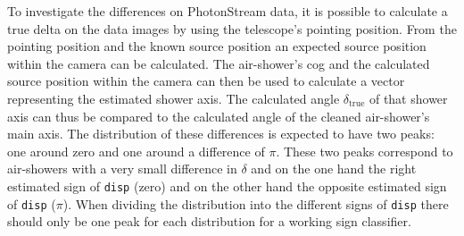 To investigate the differences on PhotonStream data, it is possible to
calculate a true delta on the data images by using the telescope's pointing
position. From the pointing position and the known source position an
expected source position within the camera can be calculated. The
air-shower's cog and the calculated source position within the camera can
then be used to calculate a vector representing the estimated shower axis.
The calculated angle $\delta_\text{true}$ of that shower axis can thus be
compared to the calculated angle of the cleaned air-shower's main axis. The
distribution of these differences is expected to have two peaks: one around
zero and one around a difference of $\pi$. These two peaks correspond to
air-showers with a very small difference in $\delta$ and on the one hand the
right estimated sign of \texttt{disp} (zero) and on the other hand the
opposite estimated sign of \texttt{disp} ($\pi$). When dividing the
distribution into the different signs of \texttt{disp} there should only be
one peak for each distribution for a working sign classifier.

